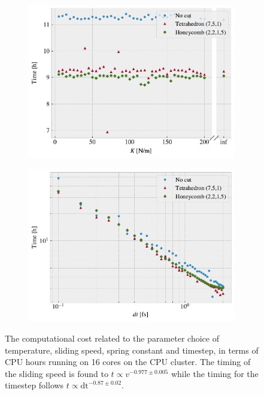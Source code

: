 \begin{figure}[H]
\begin{subfigure}[t]{0.49\textwidth}
      \includegraphics[width=\textwidth]{figures/baseline/comp_cost_K.pdf}
      \caption{}
      \label{fig:comp_K}
    \end{subfigure}
    \hfill
    \begin{subfigure}[t]{0.49\textwidth}
        \centering
        \includegraphics[width=\textwidth]{figures/baseline/comp_cost_dt.pdf}
        \caption{}
        \label{fig:comp_dt}
    \end{subfigure}
    \hfill
    \caption{The computational cost related to the parameter choice of temperature, sliding speed, spring
    constant and timestep, in terms of CPU hours running on 16 cores on the
    CPU cluster. The timing of the sliding speed is found to $t \propto
    v^{-0.977 \pm 0.005}$ while the timing for the timestep follows $t \propto \text{dt}^{-0.87\pm 0.02}$.}
    \label{fig:comp_cost}
\end{figure}

